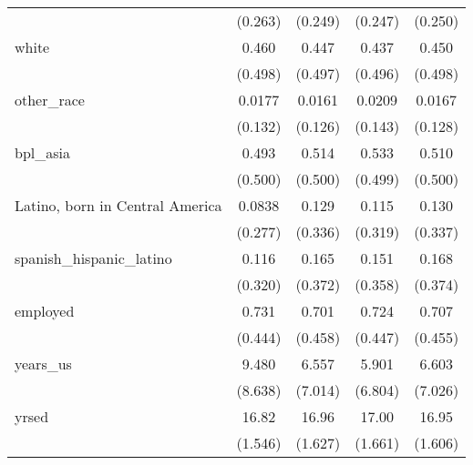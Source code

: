 \begin{table}[htbp]
\begin{tabular}{l*{4}{c}}
                    &     (0.263)         &     (0.249)         &     (0.247)         &     (0.250)         \\
[1em]
white               &       0.460         &       0.447         &       0.437         &       0.450         \\
                    &     (0.498)         &     (0.497)         &     (0.496)         &     (0.498)         \\
[1em]
other\_race          &      0.0177         &      0.0161         &      0.0209         &      0.0167         \\
                    &     (0.132)         &     (0.126)         &     (0.143)         &     (0.128)         \\
[1em]
bpl\_asia            &       0.493         &       0.514         &       0.533         &       0.510         \\
                    &     (0.500)         &     (0.500)         &     (0.499)         &     (0.500)         \\
[1em]
Latino, born in Central America&      0.0838         &       0.129         &       0.115         &       0.130         \\
                    &     (0.277)         &     (0.336)         &     (0.319)         &     (0.337)         \\
[1em]
spanish\_hispanic\_latino&       0.116         &       0.165         &       0.151         &       0.168         \\
                    &     (0.320)         &     (0.372)         &     (0.358)         &     (0.374)         \\
[1em]
employed            &       0.731         &       0.701         &       0.724         &       0.707         \\
                    &     (0.444)         &     (0.458)         &     (0.447)         &     (0.455)         \\
[1em]
years\_us            &       9.480         &       6.557         &       5.901         &       6.603         \\
                    &     (8.638)         &     (7.014)         &     (6.804)         &     (7.026)         \\
[1em]
yrsed               &       16.82         &       16.96         &       17.00         &       16.95         \\
                    &     (1.546)         &     (1.627)         &     (1.661)         &     (1.606)         \\

\end{tabular}
\end{table}
